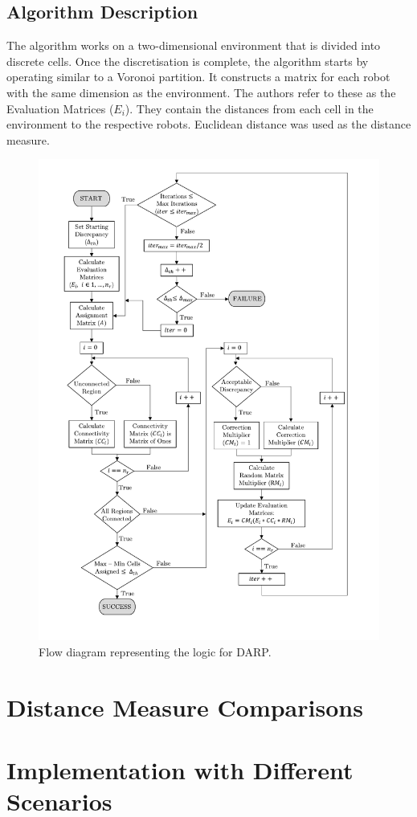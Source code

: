 \subsection{Algorithm Description}
The algorithm works on a two-dimensional environment that is divided into discrete cells. Once the discretisation is complete, the algorithm starts by operating similar to a Voronoi partition. It constructs a matrix for each robot with the same dimension as the environment. The authors refer to these as the Evaluation Matrices ($E_i$). They contain the distances from each cell in the environment to the respective robots. Euclidean distance was used as the distance measure.
\begin{figure}[h!]
	\centering
	\includegraphics[scale=0.8,trim={1.5cm 0 1.5cm 0},clip]{figs/DARP_Diagram3.pdf}
	\caption{Flow diagram representing the logic for DARP.}
	\label{fig:DARP}
\end{figure}

\section{Distance Measure Comparisons}
\label{sec:DARP dist}

\section{Implementation with Different Scenarios}
\label{sec:DARP implement}
